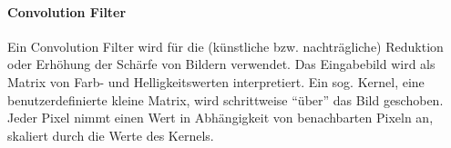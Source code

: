\documentclass{article}
\begin{document}
\paragraph{Convolution Filter}

Ein Convolution Filter wird für die (künstliche bzw. nachträgliche) Reduktion oder Erhöhung der Schärfe von Bildern verwendet. Das Eingabebild wird als Matrix von Farb- und Helligkeitswerten interpretiert. Ein sog. Kernel, eine benutzerdefinierte kleine Matrix, wird schrittweise \enquote{über} das Bild geschoben. Jeder Pixel nimmt einen Wert in Abhängigkeit von benachbarten Pixeln an, skaliert durch die Werte des Kernels.
\end{document}
